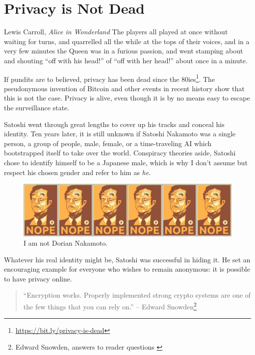 \chapter{Privacy is Not Dead}
\label{les:19}

\begin{chapquote}{Lewis Carroll, \textit{Alice in Wonderland}}
The players all played at once without waiting for turns, and quarrelled all
the while at the tops of their voices, and in a very few minutes the Queen was
in a furious passion, and went stamping about and shouting ``off with his
head!'' of ``off with her head!'' about once in a minute.
\end{chapquote}

If pundits are to believed, privacy has been dead since the
80ies\footnote{\url{https://bit.ly/privacy-is-dead}}. The pseudonymous invention
of Bitcoin and other events in recent history show that this is not the case.
Privacy is alive, even though it is by no means easy to escape the surveillance
state.

Satoshi went through great lengths to cover up his tracks and conceal
his identity. Ten years later, it is still unknown if Satoshi Nakamoto
was a single person, a group of people, male, female, or a
time-traveling AI which bootstrapped itself to take over the world.
Conspiracy theories aside, Satoshi chose to identify himself to be a
Japanese male, which is why I don't assume but respect his chosen gender
and refer to him as \textit{he}.

\begin{figure}
  \includegraphics{assets/images/nope.png}
  \caption{I am not Dorian Nakamoto.}
  \label{fig:nope}
\end{figure}

Whatever his real identity might be, Satoshi was successful in hiding
it. He set an encouraging example for everyone who wishes to remain
anonymous: it is possible to have privacy online.

\begin{quotation}
``Encryption works. Properly implemented strong crypto systems are one
of the few things that you can rely on.''
\flushright -- Edward Snowden\footnote{Edward Snowden, answers to reader questions \cite{snowden}}
\end{quotation}

